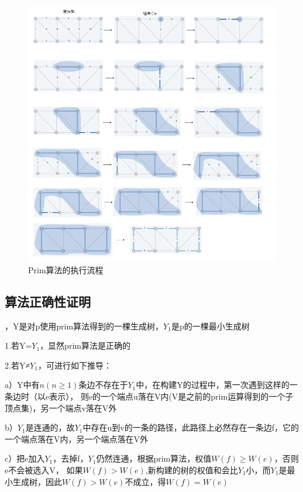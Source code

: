 \begin{figure}[hbt]
	\centering
	\includegraphics[scale=0.5]{image/prim.png}
	\caption{Prim算法的执行流程}\label{fig:Prim}
\end{figure}

\subsection{算法正确性证明}
，Y是对p使用prim算法得到的一棵生成树，$Y_1$是p的一棵最小生成树

\noindent1.若Y=$Y_1$，显然prim算法是正确的

\noindent2.若Y≠$Y_1$，可进行如下推导：

a）Y中有$n( n \geq 1 )$条边不存在于$Y_1$中，在构建Y的过程中，第一次遇到这样的一条边时（以e表示），
则e的一个端点u落在V内(V是之前的prim运算得到的一个子顶点集)，另一个端点v落在V外

b）$Y_1$是连通的，故$Y_1$中存在u到v的一条的路径，此路径上必然存在一条边f，它的一个端点落在V内，另一个端点落在V外

c）把e加入$Y_1$，去掉f，$Y_1$仍然连通，根据prim算法，权值$W(f) \geq W(e)$，否则e不会被选入V，
如果$W(f)>W(e)$,新构建的树的权值和会比$Y_1$小，而$Y_1$是最小生成树，因此$W(f)>W(e)$不成立，得$W(f)=W(e)$

